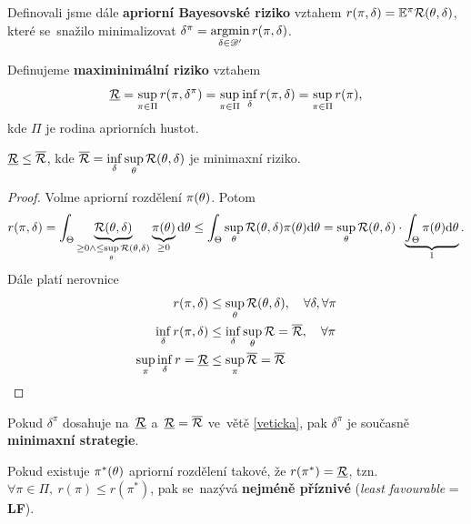 Definovali jsme dále \textbf{apriorní Bayesovské riziko} vztahem $r(\pi,\delta)=\mathbb{E}^\pi\mathcal{R}(\theta,\delta)$, které se~snažilo minimalizovat $\delta^{\pi}=\mathop{\mathrm{argmin}}\limits_{\delta\in\mathscr{D}'}r(\pi,\delta)$.
\begin{define}
	Definujeme \textbf{maximinimální riziko} vztahem $$\underline{\mathcal{R}}=\sup\limits_{\pi\in\Pi} r(\pi,\delta^{\pi})=\sup\limits_{\pi\in\Pi}\inf\limits_{\delta} r(\pi,\delta)=\sup\limits_{\pi\in\Pi}r(\pi),$$ kde $\Pi$ je rodina apriorních hustot.
\end{define}
\begin{theorem}\label{veticka}
	$\underline{\mathcal{R}}\leq \overline{\mathcal{R}}$, kde $\overline{\mathcal{R}}=\inf\limits_\delta\sup\limits_\theta \mathcal{R}(\theta,\delta)$ je minimaxní riziko.
	\begin{proof}
		Volme apriorní rozdělení $\pi(\theta)$. Potom $$ r(\pi,\delta)=\int_\Theta\underbrace{\mathcal{R}(\theta,\delta)}_{\geq0\wedge\leq \sup\limits_{\theta}\mathcal{R}(\theta,\delta)}\underbrace{\pi(\theta)}_{\geq0}\mathrm{d}\theta\leq \int_{\Theta}\sup\limits_\theta \mathcal{R}(\theta,\delta)\pi(\theta)\mathrm{d}\theta=\sup\limits_\theta \mathcal{R}(\theta,\delta)\cdot \underbrace{\int_{\Theta}\pi(\theta)\mathrm{d}\theta}_{1}.$$
		Dále platí nerovnice \[
		\begin{split}
		r(\pi,\delta)&\leq \sup\limits_\theta\mathcal{R}(\theta,\delta),\quad \forall\delta,\forall\pi\\
		\inf\limits_\delta r(\pi,\delta)&\leq \inf\limits_\delta\sup\limits_\theta \mathcal{R} =\overline{\mathcal{R}},\quad \forall\pi\\
		\sup\limits_\pi\inf\limits_\delta r=\underline{\mathcal{R}}&\leq \sup\limits_{\pi}\overline{\mathcal{R}}=\overline{\mathcal{R}}
		\end{split}
		\]
	\end{proof}
\end{theorem}
\begin{remark}
	Pokud $\delta^\pi$ dosahuje na~$\underline{\mathcal{R}}$ a~$\underline{\mathcal{R}}=\overline{\mathcal{R}}$ ve~větě \ref{veticka}, pak $\delta^\pi$ je současně \textbf{minimaxní strategie}.
\end{remark}
\begin{define}
	Pokud existuje $\pi^\ast(\theta)$ apriorní rozdělení takové, že $r(\pi ^\ast)=\underline{\mathcal{R}}$, tzn. $\forall\pi\in\Pi,~r(\pi)\leq r(\pi^\ast)$, pak se~nazývá \textbf{nejméně příznivé} (\textit{least favourable} = \textbf{LF}).
\end{define}


